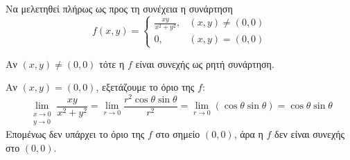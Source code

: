 \documentclass[a4paper,11pt]{report}
\begin{document}
\begin{example}
  Να μελετηθεί πλήρως ως προς τη συνέχεια η συνάρτηση 
  \[
    f(x,y) = 
    \begin{cases} 
      \frac{xy}{x^{2}+y^{2}}, & (x,y) \neq (0,0) \\ 
      0, & (x,y) = (0,0) 
    \end{cases}  
  \]
  \begin{solution}
  \item {}              
    Αν $ (x,y) \neq (0,0) $ τότε η $f$ είναι συνεχής 
    ως ρητή συνάρτηση.

    Αν $ (x,y)=(0,0) $, εξετάζουμε το όριο της $f$: 
    \[
      \lim\limits_{\substack{x\to 0 \\y \to 0}} \frac{xy}{x^{2}+y^{2}} = 
      \lim_{r \to 0} \frac{r^{2} \cos{\theta} \sin{\theta} }{ r^{2}} = 
      \lim_{r \to 0}(\cos{\theta} \sin{\theta}) = \cos{\theta} \sin{\theta} 
    \] 
    Επομένως δεν υπάρχει το όριο της $f$ στο σημείο $ (0,0) $, άρα η $f$ 
    δεν είναι συνεχής στο $ (0,0) $.
  \end{solution}
\end{example}
\end{document}
